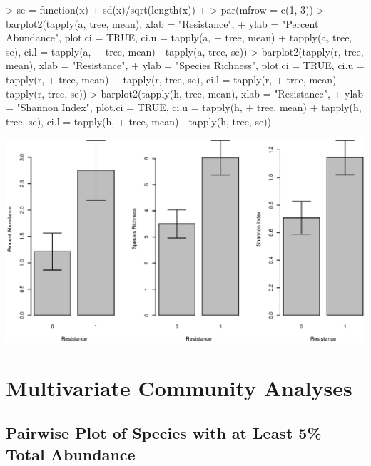 \documentclass[a4paper]{article}
\begin{document}
\begin{Schunk}
\begin{Sinput}
> se = function(x) {
+     sd(x)/sqrt(length(x))
+ }
> par(mfrow = c(1, 3))
> barplot2(tapply(a, tree, mean), xlab = "Resistance", 
+     ylab = "Percent Abundance", plot.ci = TRUE, ci.u = tapply(a, 
+         tree, mean) + tapply(a, tree, se), ci.l = tapply(a, 
+         tree, mean) - tapply(a, tree, se))
> barplot2(tapply(r, tree, mean), xlab = "Resistance", 
+     ylab = "Species Richness", plot.ci = TRUE, ci.u = tapply(r, 
+         tree, mean) + tapply(r, tree, se), ci.l = tapply(r, 
+         tree, mean) - tapply(r, tree, se))
> barplot2(tapply(h, tree, mean), xlab = "Resistance", 
+     ylab = "Shannon Index", plot.ci = TRUE, ci.u = tapply(h, 
+         tree, mean) + tapply(h, tree, se), ci.l = tapply(h, 
+         tree, mean) - tapply(h, tree, se))
\end{Sinput}
\end{Schunk}
\includegraphics{SCRL_tex-008}

\section{Multivariate Community Analyses}

\subsection{Pairwise Plot of Species with at Least 5\% Total Abundance}
\end{document}
